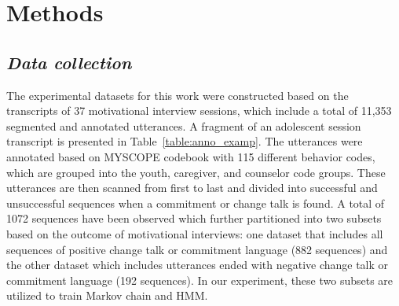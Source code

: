 \documentclass{amia}
\begin{document}
\section*{Methods}
\subsection*{\textit{Data collection}}
The experimental datasets for this work were constructed based on the transcripts of 37 motivational interview sessions, which include a total of 11,353 segmented and annotated utterances. A fragment of an adolescent session transcript is presented in Table~\ref{table:anno_examp}. The utterances were annotated based on MYSCOPE codebook \cite{carcone2013provider} with 115 different behavior codes, which are grouped into the youth, caregiver, and counselor code groups. These utterances are then scanned from first to last and divided into successful and unsuccessful sequences when a commitment or change talk is found. A total of 1072 sequences have been observed which further partitioned into two subsets based on the outcome of motivational interviews: one dataset that includes all sequences of positive change talk or commitment language (882 sequences) and the other dataset which includes utterances ended with negative change talk or commitment language (192 sequences). In our experiment, these two subsets are utilized to train Markov chain and HMM.
\end{document}

